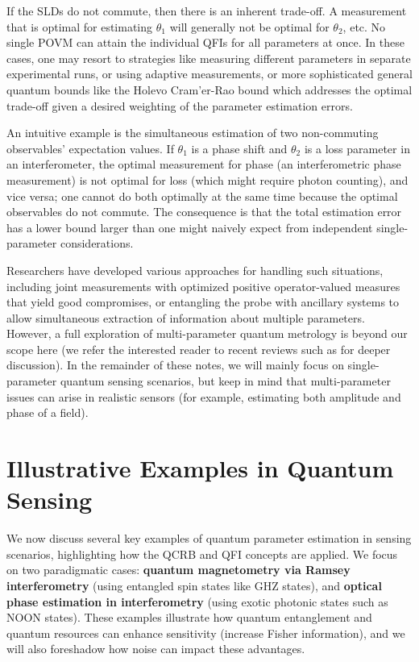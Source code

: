 If the SLDs do not commute, then there is an inherent trade-off. A
measurement that is optimal for estimating $\theta_1$ will generally
not be optimal for $\theta_2$, etc. No single POVM can attain the
individual QFIs for all parameters at once. In these cases, one may
resort to strategies like measuring different parameters in separate
experimental runs, or using adaptive measurements, or more
sophisticated general quantum bounds like the Holevo Cram'er-Rao bound
\cite{Holevo2011} which addresses the optimal trade-off given a
desired weighting of the parameter estimation errors.



An intuitive example is the simultaneous estimation of two
non-commuting observables’ expectation values. If $\theta_1$ is a
phase shift and $\theta_2$ is a loss parameter in an interferometer,
the optimal measurement for phase (an interferometric phase
measurement) is not optimal for loss (which might require photon
counting), and vice versa; one cannot do both optimally at the same
time because the optimal observables do not commute. The consequence
is that the total estimation error has a lower bound larger than one
might naively expect from independent single-parameter considerations.



Researchers have developed various approaches for handling such
situations, including joint measurements with optimized positive
operator-valued measures that yield good compromises, or entangling
the probe with ancillary systems to allow simultaneous extraction of
information about multiple parameters. However, a full exploration of
multi-parameter quantum metrology is beyond our scope here (we refer
the interested reader to recent reviews such as \cite{Ragy2016} for
deeper discussion). In the remainder of these notes, we will mainly
focus on single-parameter quantum sensing scenarios, but keep in mind
that multi-parameter issues can arise in realistic sensors (for
example, estimating both amplitude and phase of a field).



\section{Illustrative Examples in Quantum Sensing}

\label{sec:examples}



We now discuss several key examples of quantum parameter estimation in
sensing scenarios, highlighting how the QCRB and QFI concepts are
applied. We focus on two paradigmatic cases: \textbf{quantum
  magnetometry via Ramsey interferometry} (using entangled spin states
like GHZ states), and \textbf{optical phase estimation in
  interferometry} (using exotic photonic states such as NOON
states). These examples illustrate how quantum entanglement and
quantum resources can enhance sensitivity (increase Fisher
information), and we will also foreshadow how noise can impact these
advantages.



